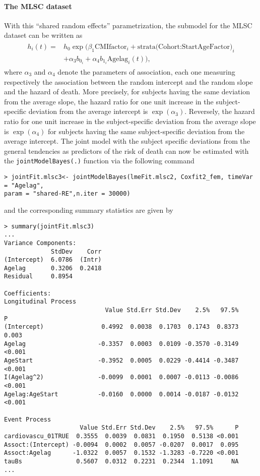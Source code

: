 \documentclass[12pt]{article}
\begin{document}
\paragraph{The MLSC dataset}
With this ``shared random effects'' parametrization, the submodel for the MLSC dataset can be written as
\begin{equation}
\begin{split}
\begin{aligned}
h_i(t) = &h_0 \exp \big(\beta_1 \text{CMIfactor}_i+ \text{strata(Cohort:StartAgeFactor)}_i \\
&+ \alpha_3 b_{0_i} + \alpha_4 b_{1_{i}} \text{Agelag}_i(t) \big),
\end{aligned}
\end{split}
\label{Survival model_mlsc3}
\end{equation}
where $\alpha_3$ and $\alpha_4$ denote the parameters of association, each one measuring respectively the association between the random intercept and the random slope and the hazard of death. More precisely, for subjects having the same deviation from the average slope, the hazard ratio for one unit increase in the subject-specific deviation from the average intercept is $\exp (\alpha_3)$. Reversely, the hazard ratio for one unit increase in the subject-specific deviation from the average slope is $\exp (\alpha_4)$ for subjects having the same subject-specific deviation from the average intercept.
The joint model with the subject specific deviations from the general tendencies as predictors of the risk of death can now be estimated with the \texttt{jointModelBayes(.)} function via the following command
\begin{verbatim}
> jointFit.mlsc3<- jointModelBayes(lmeFit.mlsc2, Coxfit2_fem, timeVar = "Agelag",
param = "shared-RE",n.iter = 30000) 
\end{verbatim}
and the corresponding summary statistics are given by
\begin{verbatim}
> summary(jointFit.mlsc3)
...
Variance Components:
             StdDev    Corr
(Intercept)  6.0786  (Intr)
Agelag       0.3206  0.2418
Residual     0.8954        

Coefficients:
Longitudinal Process
                            Value Std.Err Std.Dev    2.5%   97.5%      P
(Intercept)                0.4992  0.0038  0.1703  0.1743  0.8373  0.003
Agelag                    -0.3357  0.0003  0.0109 -0.3570 -0.3149 <0.001
AgeStart                  -0.3952  0.0005  0.0229 -0.4414 -0.3487 <0.001
I(Agelag^2)               -0.0099  0.0001  0.0007 -0.0113 -0.0086 <0.001
Agelag:AgeStart           -0.0160  0.0000  0.0014 -0.0187 -0.0132 <0.001

Event Process
                     Value Std.Err Std.Dev    2.5%   97.5%      P
cardiovascu_01TRUE  0.3555  0.0039  0.0831  0.1950  0.5138 <0.001
Assoct:(Intercept) -0.0094  0.0002  0.0057 -0.0207  0.0017  0.095
Assoct:Agelag      -1.0322  0.0057  0.1532 -1.3283 -0.7220 <0.001
tauBs               0.5607  0.0312  0.2231  0.2344  1.1091     NA
...
\end{verbatim}
\end{document}
